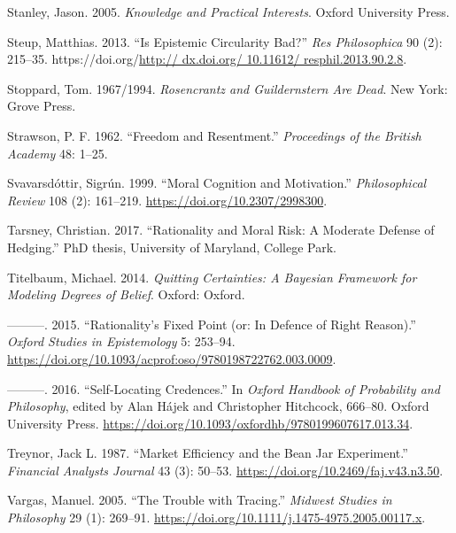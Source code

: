 \documentclass[
  10pt,
  letterpaper,
  twoside]{scrbook}
\newlength{\cslhangindent}
\newenvironment{CSLReferences}[2] %
 {\begin{list}{}{%
  \setlength{\itemindent}{0pt}
  \setlength{\leftmargin}{0pt}
  \setlength{\parsep}{0pt}
  \ifodd #1
   \setlength{\leftmargin}{\cslhangindent}
   \setlength{\itemindent}{-1\cslhangindent}
  \fi
  \setlength{\itemsep}{#2\baselineskip}}}
 {\end{list}}
\begin{document}
\begin{CSLReferences}{1}{0}
Stanley, Jason. 2005. \emph{{Knowledge and Practical Interests}}. Oxford
University Press.

Steup, Matthias. 2013. {``Is Epistemic Circularity Bad?''} \emph{Res
Philosophica} 90 (2): 215--35.
https://doi.org/\href{http://\%20dx.doi.org/\%2010.11612/\%20resphil.2013.90.2.8}{http://
dx.doi.org/ 10.11612/ resphil.2013.90.2.8}.

Stoppard, Tom. 1967/1994. \emph{Rosencrantz and Guildernstern Are Dead}.
New York: Grove Press.

Strawson, P. F. 1962. {``Freedom and Resentment.''} \emph{Proceedings of
the British Academy} 48: 1--25.

Svavarsdóttir, Sigrún. 1999. {``Moral Cognition and Motivation.''}
\emph{Philosophical Review} 108 (2): 161--219.
\url{https://doi.org/10.2307/2998300}.

Tarsney, Christian. 2017. {``Rationality and Moral Risk: A Moderate
Defense of Hedging.''} PhD thesis, University of Maryland, College Park.

Titelbaum, Michael. 2014. \emph{Quitting Certainties: A Bayesian
Framework for Modeling Degrees of Belief}. Oxford: Oxford.

---------. 2015. {``Rationality's Fixed Point (or: In Defence of Right
Reason).''} \emph{Oxford Studies in Epistemology} 5: 253--94.
\url{https://doi.org/10.1093/acprof:oso/9780198722762.003.0009}.

---------. 2016. {``Self-Locating Credences.''} In \emph{Oxford Handbook
of Probability and Philosophy}, edited by Alan Hájek and Christopher
Hitchcock, 666--80. {O}xford {U}niversity {P}ress.
\url{https://doi.org/10.1093/oxfordhb/9780199607617.013.34}.

Treynor, Jack L. 1987. {``Market Efficiency and the Bean Jar
Experiment.''} \emph{Financial Analysts Journal} 43 (3): 50--53.
\url{https://doi.org/10.2469/faj.v43.n3.50}.

Vargas, Manuel. 2005. {``The Trouble with Tracing.''} \emph{Midwest
Studies in Philosophy} 29 (1): 269--91.
\url{https://doi.org/10.1111/j.1475-4975.2005.00117.x}.


\end{CSLReferences}
\end{document}
